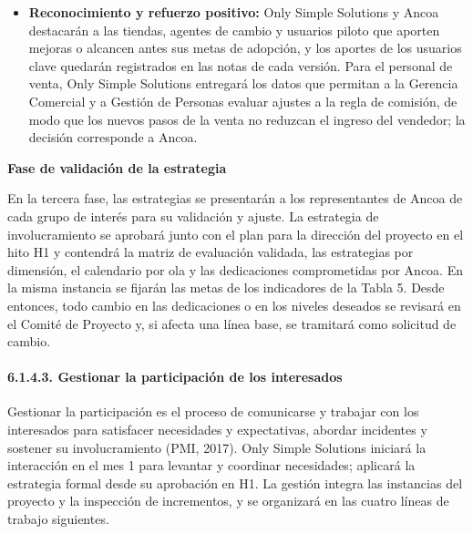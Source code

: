 \documentclass[11pt]{article}
\begin{document}
\begin{itemize}
  la separación de datos. Las jefaturas, vendedores y cajeros de las
  tiendas del piloto probarán la solución antes de cada ola, y se
  realizarán talleres con vendedores de marketplace, proveedores y
  transportistas, a través de Ancoa, para validar sus integraciones.
  Antes del hito H6 habrá un agente de cambio en cada una de las 22
  tiendas, elegido por su jefatura.
\item
  \textbf{Reconocimiento y refuerzo positivo:} Only Simple Solutions y
  Ancoa destacarán a las tiendas, agentes de cambio y usuarios piloto
  que aporten mejoras o alcancen antes sus metas de adopción, y los
  aportes de los usuarios clave quedarán registrados en las notas de
  cada versión. Para el personal de venta, Only Simple Solutions
  entregará los datos que permitan a la Gerencia Comercial y a Gestión
  de Personas evaluar ajustes a la regla de comisión, de modo que los
  nuevos pasos de la venta no reduzcan el ingreso del vendedor; la
  decisión corresponde a Ancoa.
\end{itemize}

\textbf{Fase de validación de la estrategia}

En la tercera fase, las estrategias se presentarán a los representantes
de Ancoa de cada grupo de interés para su validación y ajuste. La
estrategia de involucramiento se aprobará junto con el plan para la
dirección del proyecto en el hito H1 y contendrá la matriz de evaluación
validada, las estrategias por dimensión, el calendario por ola y las
dedicaciones comprometidas por Ancoa. En la misma instancia se fijarán
las metas de los indicadores de la Tabla 5. Desde entonces, todo
cambio en las dedicaciones o en los niveles deseados se revisará en el
Comité de Proyecto y, si afecta una línea base, se tramitará como
solicitud de cambio.

\paragraph{6.1.4.3. Gestionar la participación de los interesados}\label{6-1-4-3-gestionar-la-participacion-de-los-interesados}

Gestionar la participación es el proceso de comunicarse y trabajar con los interesados para satisfacer necesidades y expectativas, abordar incidentes y sostener su involucramiento (PMI, 2017). Only Simple Solutions iniciará la interacción en el mes 1 para levantar y coordinar necesidades; aplicará la estrategia formal desde su aprobación en H1. La gestión integra las instancias del proyecto y la inspección de incrementos, y se organizará en las cuatro líneas de trabajo siguientes.
\end{document}

